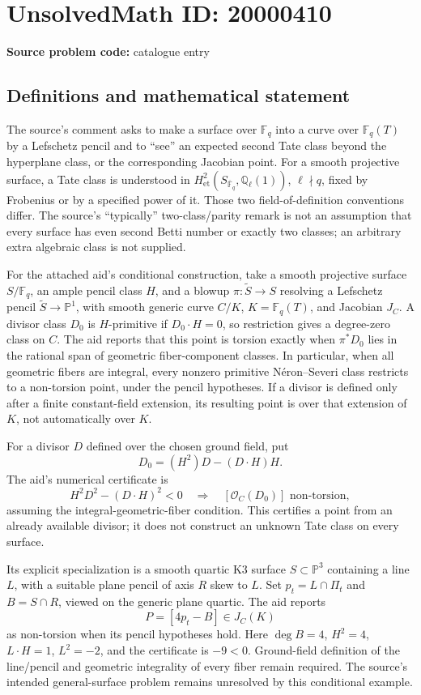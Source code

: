 \documentclass[11pt]{article}
\newcommand{\Q}{\mathbb{Q}}
\newcommand{\F}{\mathbb{F}}
\newcommand{\PP}{\mathbb{P}}
\begin{document}
\section*{UnsolvedMath ID: 20000410}
\textbf{Source problem code:} catalogue entry
\subsection{Definitions and mathematical statement}
The source's comment asks to make a surface over \(\F_q\) into a curve over \(\F_q(T)\) by a Lefschetz pencil and to ``see'' an expected second Tate class beyond the hyperplane class, or the corresponding Jacobian point. For a smooth projective surface, a Tate class is understood in \(H^2_{\mathrm{et}}(S_{\overline{\F}_q},\Q_\ell(1))\), \(\ell\nmid q\), fixed by Frobenius or by a specified power of it. Those two field-of-definition conventions differ. The source's ``typically'' two-class/parity remark is not an assumption that every surface has even second Betti number or exactly two classes; an arbitrary extra algebraic class is not supplied.

For the attached aid's conditional construction, take a smooth projective surface \(S/\F_q\), an ample pencil class \(H\), and a blowup \(\pi:\widetilde S\to S\) resolving a Lefschetz pencil \(\widetilde S\to\PP^1\), with smooth generic curve \(C/K\), \(K=\F_q(T)\), and Jacobian \(J_C\). A divisor class \(D_0\) is \(H\)-primitive if \(D_0\cdot H=0\), so restriction gives a degree-zero class on \(C\). The aid reports that this point is torsion exactly when \(\pi^*D_0\) lies in the rational span of geometric fiber-component classes. In particular, when all geometric fibers are integral, every nonzero primitive N\'eron--Severi class restricts to a non-torsion point, under the pencil hypotheses. If a divisor is defined only after a finite constant-field extension, its resulting point is over that extension of \(K\), not automatically over \(K\).

For a divisor \(D\) defined over the chosen ground field, put
\[
D_0=(H^2)D-(D\cdot H)H.
\]
The aid's numerical certificate is
\[
H^2D^2-(D\cdot H)^2<0
\quad\Longrightarrow\quad
[\mathcal O_C(D_0)]\text{ non-torsion},
\]
assuming the integral-geometric-fiber condition. This certifies a point from an already available divisor; it does not construct an unknown Tate class on every surface.

Its explicit specialization is a smooth quartic K3 surface \(S\subset\PP^3\) containing a line \(L\), with a suitable plane pencil of axis \(R\) skew to \(L\). Set \(p_t=L\cap\Pi_t\) and \(B=S\cap R\), viewed on the generic plane quartic. The aid reports
\[
P=[4p_t-B]\in J_C(K)
\]
as non-torsion when its pencil hypotheses hold. Here \(\deg B=4\), \(H^2=4\), \(L\cdot H=1\), \(L^2=-2\), and the certificate is \(-9<0\). Ground-field definition of the line/pencil and geometric integrality of every fiber remain required. The source's intended general-surface problem remains unresolved by this conditional example.
\end{document}
